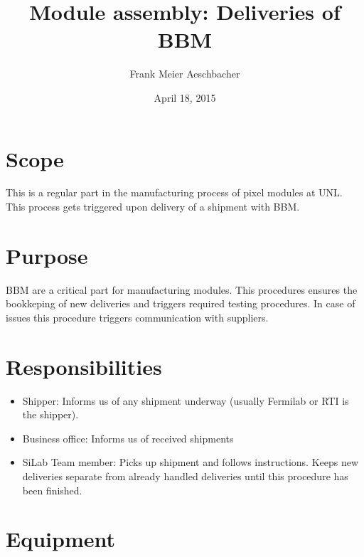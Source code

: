 \documentclass[12pt]{unlsilabsop}
\title{Module assembly: Deliveries of BBM}
\date{April 18, 2015}
\author{Frank Meier Aeschbacher}
\begin{document}
\maketitle

\section{Scope}
This is a regular part in the manufacturing process of pixel modules at UNL. This process gets triggered upon delivery of a shipment with BBM.

\section{Purpose}
BBM are a critical part for manufacturing modules. This procedures ensures the bookkeping of new deliveries and triggers required testing procedures. In case of issues this procedure triggers communication with suppliers.


\section{Responsibilities}

\begin{itemize}
    \item Shipper: Informs us of any shipment underway (usually Fermilab or RTI is the shipper).
    \item Business office: Informs us of received shipments
    \item SiLab Team member: Picks up shipment and follows instructions. Keeps new deliveries separate from already handled deliveries until this procedure has been finished.
\end{itemize}

\section{Equipment}
\end{document}
